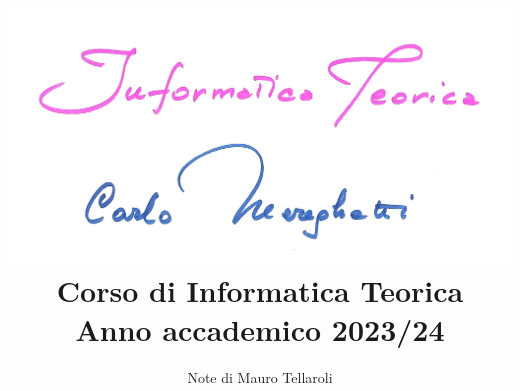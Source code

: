 \documentclass[a4paper]{article}
\begin{document}
\title{
    \includegraphics[width=\textwidth]{Mere.png}\\
    Corso di Informatica Teorica\\
    \Large Anno accademico 2023/24
}
\author{
    \large Note di Mauro Tellaroli
}
\date{}

\maketitle

\thispagestyle{empty}

\clearpage

\addtocounter{page}{-1}
\tableofcontents
\clearpage

\setcounter{section}{-1}

\clearpage

\clearpage

\clearpage
\end{document}
